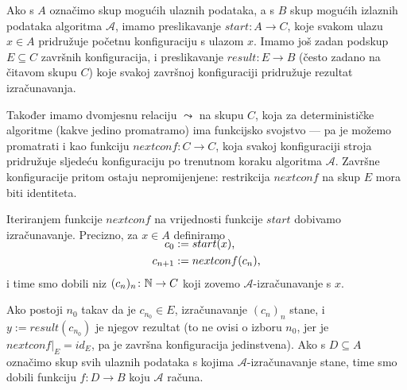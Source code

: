 Ako s $A$ označimo skup mogućih ulaznih podataka, a s $B$ skup mogućih izlaznih podataka algoritma $\mathcal A$, imamo preslikavanje $start\colon A\to C$, koje svakom ulazu $x\in A$ pridružuje početnu konfiguraciju s ulazom $x$. Imamo još zadan podskup $E\subseteq C$ završnih konfiguracija, i preslikavanje $result\colon E\to B$ (često zadano na čitavom skupu $C$) koje svakoj završnoj konfiguraciji pridružuje rezultat izračunavanja.

Također imamo dvomjesnu relaciju $\leadsto$ na skupu $C$, koja za determinističke algoritme (kakve jedino promatramo) ima funkcijsko svojstvo --- pa je možemo promatrati i kao funkciju $nextconf\colon C\to C$, koja svakoj konfiguraciji stroja pridružuje sljedeću konfiguraciju po trenutnom koraku algoritma $\mathcal A$. Završne konfiguracije pritom ostaju nepromijenjene: restrikcija $nextconf$ na skup $E$ mora biti identiteta.

Iteriranjem funkcije $nextconf$ na vrijednosti funkcije $start$ dobivamo izračunavanje. Precizno, za $x\in A$ definiramo
\begin{align}
\SwapAboveDisplaySkip
    c_0&:=start(x)\text,\\
    c_{n+1}&:=nextconf(c_n)\text,
\end{align}
i time smo dobili niz $(c_n)_n\colon{\mathbb N}\to C$ koji zovemo $\mathcal A$-izračunavanje s $x$.

Ako postoji $n_0$ takav da je $c_{n_0}\in E$, izračunavanje $(c_n)_n$ stane, i $y:=result(c_{n_0})$ je njegov rezultat (to ne ovisi o izboru $n_0$, jer je $nextconf|_E=id_E$, pa je završna konfiguracija jedinstvena). Ako s $D\subseteq A$ označimo skup svih ulaznih podataka s kojima $\mathcal A$-izračunavanje stane, time smo dobili funkciju $f\colon D\to B$ koju $\mathcal A$ računa.
\vspace{-5mm}

